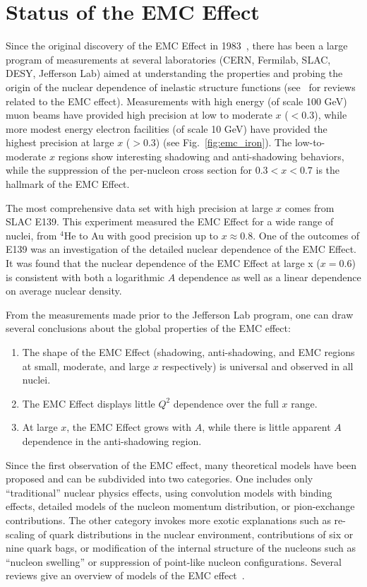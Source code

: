 \section{Status of the EMC Effect}

Since the original discovery of the EMC Effect in 1983~\cite{Aubert:1983xm}, there has been a large
program of measurements at several laboratories (CERN, Fermilab, SLAC, DESY, Jefferson Lab)
aimed at understanding the properties and probing the origin of the nuclear dependence of inelastic
structure functions (see~\cite{Geesaman:1995yd, Malace:2014uea, Hen:2016kwk} for reviews related to the EMC effect).
Measurements with high energy (of scale 100 GeV) muon beams have provided high precision at low to
moderate $x$ ($<0.3$), while more modest energy electron facilities (of scale 10 GeV) have provided
the highest precision at large $x$ ($>0.3$) (see Fig.~\ref{fig:emc_iron}).  The low-to-moderate $x$
regions show interesting shadowing and anti-shadowing behaviors, while the suppression of the
per-nucleon cross section for $0.3<x<0.7$ is the hallmark of the EMC Effect.

The most comprehensive data set with high precision at large $x$ comes from SLAC E139. This experiment
measured the EMC Effect for a wide range of nuclei, from $^4$He to Au with good precision up to
$x\approx0.8$.  One of the outcomes of E139 was an investigation of the detailed nuclear dependence of the EMC
Effect. It was found that the nuclear dependence of the EMC Effect at large x ($x=0.6$) is consistent
with both a logarithmic $A$ dependence as well as a linear dependence on average nuclear density.

From the measurements made prior to the Jefferson Lab program, one can draw several conclusions about
the global properties of the EMC effect:
\begin{enumerate}
 \item{The shape of the EMC Effect (shadowing, anti-shadowing, and EMC regions at small, moderate, and
  large $x$ respectively) is universal and observed in all nuclei.}
 \item{The EMC Effect displays little $Q^2$ dependence over the full $x$ range.}
 \item{At large $x$, the EMC Effect grows with $A$, while there is little apparent $A$ dependence in the
   anti-shadowing region.}
\end{enumerate}

Since the first observation of the EMC effect, many theoretical models have been proposed and can be subdivided into two categories.  One includes only ``traditional'' nuclear physics effects, using convolution models with binding effects, detailed models of the nucleon momentum distribution, or pion-exchange contributions. The other category invokes more exotic explanations such as re-scaling of quark distributions in the nuclear environment, contributions of six or nine
quark bags, or modification of the internal structure of the nucleons such as ``nucleon swelling'' or suppression of point-like nucleon configurations. Several reviews give an overview of models of the EMC effect~\cite{Geesaman:1995yd, Norton:2003cb, Piller:1999wx, Hen:2013oha, Malace:2014uea}.


